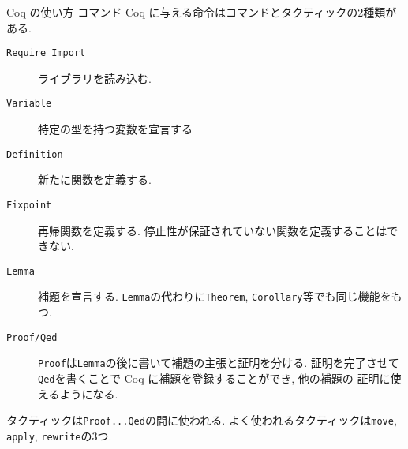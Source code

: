 \documentclass[dvipdfmx,cjk]{beamer}
\theoremstyle{mystyle}
\newcommand{\0}{\textbf{0}}
\begin{document}
\begin{frame}{Coq の使い方 コマンド}
  Coq に与える命令はコマンドとタクティックの2種類がある. 
	\begin{description}
	  \item[\tt Require Import] ライブラリを読み込む.
	  \item[\tt Variable] 特定の型を持つ変数を宣言する
	  \item[\tt Definition] 新たに関数を定義する.
	  \item[\tt Fixpoint] 再帰関数を定義する. 
	  	停止性が保証されていない関数を定義することはできない.
	  \item[\tt Lemma] 補題を宣言する. 
	    {\tt Lemma}の代わりに{\tt Theorem}, {\tt Corollary}等でも同じ機能をもつ. 
	  \item[\tt Proof/Qed]
	    {\tt Proof}は{\tt Lemma}の後に書いて補題の主張と証明を分ける.  
	    証明を完了させて{\tt Qed}を書くことで Coq に補題を登録することができ, 他の補題の
	    証明に使えるようになる. 
	\end{description}
	タクティックは{\tt Proof...Qed}の間に使われる. 
	よく使われるタクティックは{\tt move}, {\tt apply}, {\tt rewrite}の3つ.
\end{frame}
\end{document}
